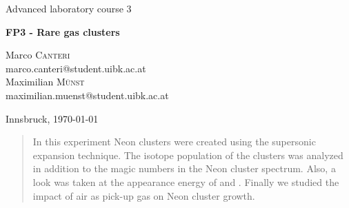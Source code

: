 \documentclass[a4paper,10pt]{article}
\begin{document}
\begin{titlepage}
 \begin{center}
	\Large{Advanced laboratory course 3}
	\end{center}
	\begin{center}
	 \LARGE{\textbf{FP3 - Rare gas clusters}}
	\end{center}

	\begin{center}

	\large Marco \textsc{Canteri} \\
	marco.canteri@student.uibk.ac.at\\
	\large Maximilian \textsc{Münst} \\
	maximilian.muenst@student.uibk.ac.at
	\end{center}

	\begin{center}
	\vspace{1cm}
	Innsbruck, \today
	\vspace{1cm}
	\end{center}

	\begin{abstract}
	In this experiment Neon clusters were created using the supersonic expansion technique. The isotope population of the clusters was analyzed in addition to the magic numbers in the Neon cluster spectrum. Also, a look was taken at the appearance energy of  and . Finally we studied the	impact of air as pick-up gas on Neon cluster growth.
    \end{abstract}
    \vspace{1cm}


\end{titlepage}
\end{document}
